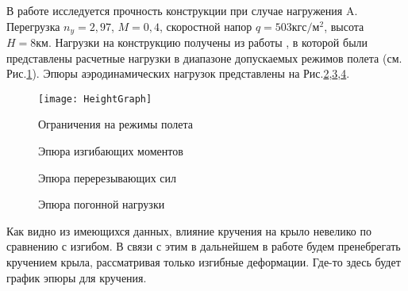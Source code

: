 В работе исследуется прочность конструкции при случае нагружения A. Перегрузка $n_y = 2,97$, $M = 0,4$, скоростной напор $q = 503 \text{кгс}/\text{м}^2$, высота $H = 8\text{км}$. Нагрузки на конструкцию получены из работы \cite{BPS}, в которой были представлены расчетные нагрузки в диапазоне допускаемых режимов полета (см. Рис.\ref{fig:ModeOfFlight}). 
Эпюры аэродинамических нагрузок представлены на Рис.\ref{fig:BendingMoments},\ref{fig:CuttingForces},\ref{fig:DistributedLoad}.



\begin{figure}[H]
\centering
\texttt{[image: HeightGraph]}
\caption{Ограничения на режимы полета}
\label{fig:ModeOfFlight}
\end{figure}


\begin{figure}[H]
\centering
\def\svgwidth{0.7\textwidth}

\caption{Эпюра изгибающих моментов}
\label{fig:BendingMoments}
\end{figure}

\begin{figure}[H]
\centering
\def\svgwidth{0.7\textwidth}

\caption{Эпюра перерезывающих сил}
\label{fig:CuttingForces}
\end{figure}

\begin{figure}[H]
\centering
\def\svgwidth{0.7\textwidth}

\caption{Эпюра погонной нагрузки}
\label{fig:DistributedLoad}
\end{figure}

Как видно из имеющихся данных, влияние кручения на крыло невелико по сравнению с изгибом. В связи с этим в дальнейшем в работе будем пренебрегать кручением крыла, рассматривая только изгибные деформации. Где-то здесь будет график эпюры для кручения.

